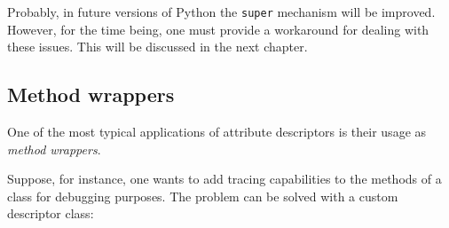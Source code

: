 \documentclass[10pt,english]{article}
\begin{document}
Probably, in future versions of Python the \texttt{super} mechanism will be 
improved. However, for the time being, one must provide a workaround for 
dealing with these issues. This will be discussed in the next chapter.



\hypertarget{method-wrappers}{}
\subsection*{Method wrappers}

One of the most typical applications of attribute descriptors is their
usage as \emph{method wrappers}.

Suppose, for instance, one wants to add tracing capabilities to 
the methods of a class for debugging purposes. The problem
can be solved with a custom descriptor class:
\end{document}
